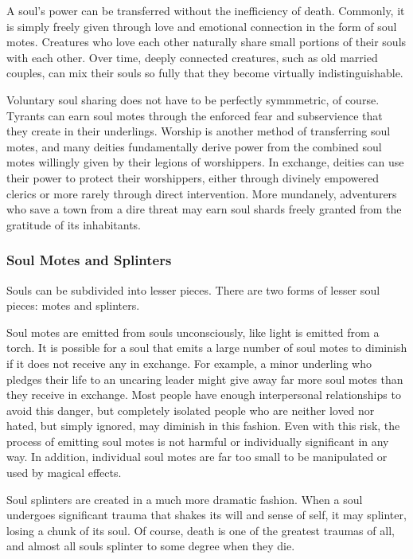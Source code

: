             A soul's power can be transferred without the inefficiency of death.
            Commonly, it is simply freely given through love and emotional connection in the form of soul motes.
            Creatures who love each other naturally share small portions of their souls with each other.
            Over time, deeply connected creatures, such as old married couples, can mix their souls so fully that they become virtually indistinguishable.

            Voluntary soul sharing does not have to be perfectly symmmetric, of course.
            Tyrants can earn soul motes through the enforced fear and subservience that they create in their underlings.
            Worship is another method of transferring soul motes, and many deities fundamentally derive power from the combined soul motes willingly given by their legions of worshippers.
            In exchange, deities can use their power to protect their worshippers, either through divinely empowered clerics or more rarely through direct intervention.
            More mundanely, adventurers who save a town from a dire threat may earn soul shards freely granted from the gratitude of its inhabitants.

        \subsubsection{Soul Motes and Splinters}
            Souls can be subdivided into lesser pieces.
            There are two forms of lesser soul pieces: motes and splinters.

            Soul motes are emitted from souls unconsciously, like light is emitted from a torch.
            It is possible for a soul that emits a large number of soul motes to diminish if it does not receive any in exchange.
            For example, a minor underling who pledges their life to an uncaring leader might give away far more soul motes than they receive in exchange.
            Most people have enough interpersonal relationships to avoid this danger, but completely isolated people who are neither loved nor hated, but simply ignored, may diminish in this fashion.
            Even with this risk, the process of emitting soul motes is not harmful or individually significant in any way.
            In addition, individual soul motes are far too small to be manipulated or used by magical effects.

            Soul splinters are created in a much more dramatic fashion.
            When a soul undergoes significant trauma that shakes its will and sense of self, it may splinter, losing a chunk of its soul.
            Of course, death is one of the greatest traumas of all, and almost all souls splinter to some degree when they die.

